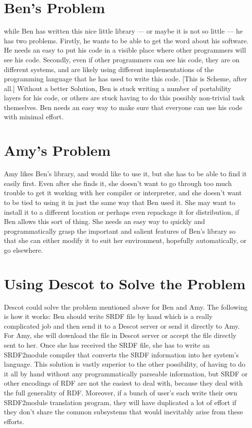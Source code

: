 \section{Ben's Problem}{}%
while Ben has written this nice little library --- or maybe it is not
so little --- he has two problems. Firstly, he wants to be able to
get the word about his software. He needs an easy to put his code in a
visible place where other programmers will see his code. Secondly,
even if other programmers can see his code, they are on different
systems, and are likely using different implementations of the
programming language that he has used to write this code. [This is
Scheme, after all.] Without a better Solution, Ben is stuck writing a
number of portability layers for his code, or others are stuck having
to do this possibly non-trivial task themselves. Ben needs an easy way
to make sure that everyone can use his code with minimal effort.

\section{Amy's Problem}{}%
Amy likes Ben's library, and would like to use it, but she has to be
able to find it easily first. Even after she finds it, she doesn't
want to go through too much trouble to get it working with her
compiler or interpreter, and she doesn't want to be tied to using it
in just the same way that Ben used it. She may want to install it to a
different location or perhaps even repackage it for distribution, if
Ben allows this sort of thing. She needs an easy way to quickly and
programmatically grasp the important and salient features of Ben's
library so that she can either modify it to suit her environment,
hopefully automatically, or go elsewhere. 

\section{Using Descot to Solve the Problem}{}%
Descot could solve the problem mentioned above for Ben and Amy. The 
following is how it works: Ben should write SRDF file by hand which 
is a really complicated job and then send it to a Descot server or send
it directly to Amy. For Amy, she will download the file in Descot
server or accept the file directly sent to her. Once she has received the
SRDF file, she has to write an SRDF2module compiler that converts the
SRDF information into her system's language. 
This solution is vastly superior to the other possibility, of having
to do it all by hand without any programmatically parseable
information, but SRDF or other encodings of RDF are not the easiest to
deal with, because they deal with the full generality of RDF.
Moreover, if a bunch of user's each write their own SRDF2module
translation program, they will have duplicated a lot of effort if they
don't share the common subsystems that would inevitably arise from
these efforts. 

